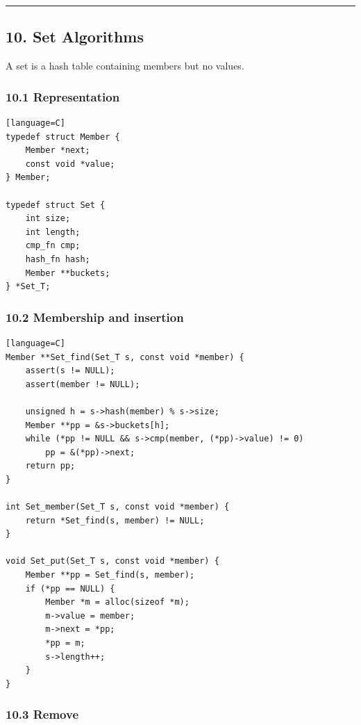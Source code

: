 \documentclass[11pt]{article}
\begin{document}
\begin{center}\rule{0.5\linewidth}{0.5pt}\end{center}

\subsection{10. Set Algorithms}\label{set-algorithms}

A set is a hash table containing members but no values.

\subsubsection{10.1 Representation}\label{representation-2}

\begin{verbatim}[language=C]
typedef struct Member {
    Member *next;
    const void *value;
} Member;

typedef struct Set {
    int size;
    int length;
    cmp_fn cmp;
    hash_fn hash;
    Member **buckets;
} *Set_T;
\end{verbatim}

\subsubsection{10.2 Membership and insertion}\label{membership-and-insertion}

\begin{verbatim}[language=C]
Member **Set_find(Set_T s, const void *member) {
    assert(s != NULL);
    assert(member != NULL);

    unsigned h = s->hash(member) % s->size;
    Member **pp = &s->buckets[h];
    while (*pp != NULL && s->cmp(member, (*pp)->value) != 0)
        pp = &(*pp)->next;
    return pp;
}

int Set_member(Set_T s, const void *member) {
    return *Set_find(s, member) != NULL;
}

void Set_put(Set_T s, const void *member) {
    Member **pp = Set_find(s, member);
    if (*pp == NULL) {
        Member *m = alloc(sizeof *m);
        m->value = member;
        m->next = *pp;
        *pp = m;
        s->length++;
    }
}
\end{verbatim}

\subsubsection{10.3 Remove}\label{remove}
\end{document}
